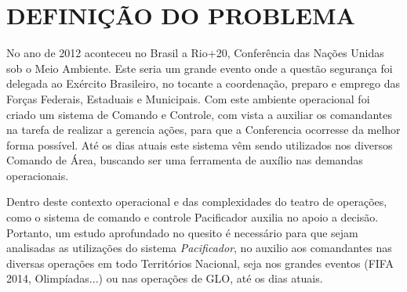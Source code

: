 % 
%


\chapter{DEFINIÇÃO DO PROBLEMA}
\label{chap:definicaoproblema}

No ano de 2012 aconteceu no Brasil a Rio+20, Conferência das Nações Unidas sob o Meio Ambiente. Este seria um grande evento onde a questão segurança foi delegada ao Exército Brasileiro, no tocante a coordenação, preparo e emprego das Forças Federais, Estaduais e Municipais. Com este ambiente operacional foi criado um sistema de Comando e Controle, com vista a auxiliar os comandantes na tarefa de realizar a gerencia ações, para que a Conferencia ocorresse da melhor forma possível. Até os dias atuais este sistema vêm sendo utilizados nos diversos Comando de Área, buscando ser uma ferramenta de auxílio nas demandas operacionais. 

Dentro deste contexto operacional e das complexidades do teatro de operações, como o sistema de comando e controle Pacificador auxilia no apoio a decisão. Portanto, um estudo aprofundado no quesito é necessário para que sejam analisadas as utilizações do sistema \textit{Pacificador}, no auxilio aos comandantes nas diversas operações em todo Territórios Nacional, seja nos grandes eventos (FIFA 2014, Olimpíadas...) ou nas operações de GLO, até os dias atuais.






